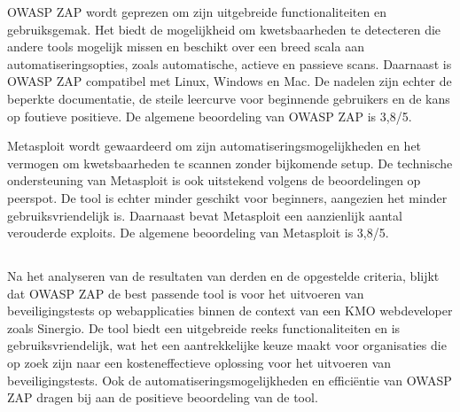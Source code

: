 OWASP ZAP wordt geprezen om zijn uitgebreide functionaliteiten en gebruiksgemak. Het biedt de mogelijkheid om kwetsbaarheden 
te detecteren die andere tools mogelijk missen en beschikt over een breed scala aan automatiseringsopties, zoals automatische, 
actieve en passieve scans. Daarnaast is OWASP ZAP compatibel met Linux, Windows en Mac. De nadelen zijn echter de beperkte 
documentatie, de steile leercurve voor beginnende gebruikers en de kans op foutieve positieve. De algemene beoordeling van 
OWASP ZAP is 3,8/5.

Metasploit wordt gewaardeerd om zijn automatiseringsmogelijkheden en het vermogen om kwetsbaarheden te scannen zonder 
bijkomende setup. De technische ondersteuning van Metasploit is ook uitstekend volgens de beoordelingen op peerspot. De tool 
is echter minder geschikt voor beginners, aangezien het minder gebruiksvriendelijk is. Daarnaast bevat Metasploit een 
aanzienlijk aantal verouderde exploits. De algemene beoordeling van Metasploit is 3,8/5.

\subsection{}
\label{sec:Definitieve_pentesttool}
Na het analyseren van de resultaten van derden en de opgestelde criteria, blijkt dat OWASP ZAP de best passende tool is voor het uitvoeren van 
beveiligingstests op webapplicaties binnen de context van een KMO webdeveloper zoals Sinergio. De tool biedt een uitgebreide reeks functionaliteiten en is gebruiksvriendelijk, wat 
het een aantrekkelijke keuze maakt voor organisaties die op zoek zijn naar een kosteneffectieve oplossing voor het uitvoeren 
van beveiligingstests. Ook de automatiseringsmogelijkheden en efficiëntie van OWASP ZAP dragen bij aan de positieve 
beoordeling van de tool.

\section{}
\subsection{}


